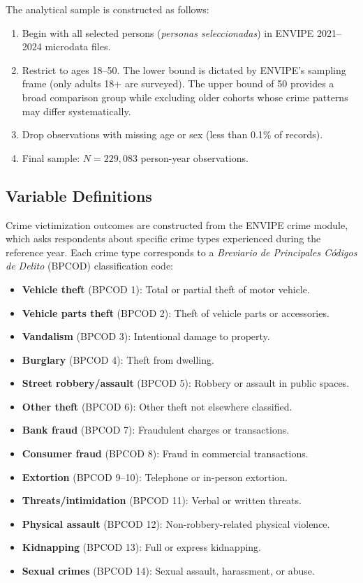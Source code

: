 \documentclass[12pt]{article}
\begin{document}
The analytical sample is constructed as follows:

\begin{enumerate}
    \item Begin with all selected persons (\textit{personas seleccionadas}) in ENVIPE 2021--2024 microdata files.
    \item Restrict to ages 18--50. The lower bound is dictated by ENVIPE's sampling frame (only adults 18+ are surveyed). The upper bound of 50 provides a broad comparison group while excluding older cohorts whose crime patterns may differ systematically.
    \item Drop observations with missing age or sex (less than 0.1\% of records).
    \item Final sample: $N = 229{,}083$ person-year observations.
\end{enumerate}

\subsection{Variable Definitions}

Crime victimization outcomes are constructed from the ENVIPE crime module, which asks respondents about specific crime types experienced during the reference year. Each crime type corresponds to a \textit{Breviario de Principales C{\'o}digos de Delito} (BPCOD) classification code:

\begin{itemize}
    \item \textbf{Vehicle theft} (BPCOD 1): Total or partial theft of motor vehicle.
    \item \textbf{Vehicle parts theft} (BPCOD 2): Theft of vehicle parts or accessories.
    \item \textbf{Vandalism} (BPCOD 3): Intentional damage to property.
    \item \textbf{Burglary} (BPCOD 4): Theft from dwelling.
    \item \textbf{Street robbery/assault} (BPCOD 5): Robbery or assault in public spaces.
    \item \textbf{Other theft} (BPCOD 6): Other theft not elsewhere classified.
    \item \textbf{Bank fraud} (BPCOD 7): Fraudulent charges or transactions.
    \item \textbf{Consumer fraud} (BPCOD 8): Fraud in commercial transactions.
    \item \textbf{Extortion} (BPCOD 9--10): Telephone or in-person extortion.
    \item \textbf{Threats/intimidation} (BPCOD 11): Verbal or written threats.
    \item \textbf{Physical assault} (BPCOD 12): Non-robbery-related physical violence.
    \item \textbf{Kidnapping} (BPCOD 13): Full or express kidnapping.
    \item \textbf{Sexual crimes} (BPCOD 14): Sexual assault, harassment, or abuse.
\end{itemize}
\end{document}
